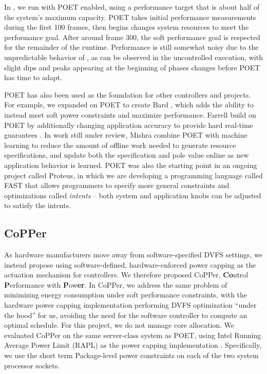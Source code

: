 In , we run with POET enabled, using a performance target that is about half of the system's maximum capacity.
POET takes initial performance measurements during the first 100 frames, then begins changes system resources to meet the performance goal.
After around frame 300, the soft performance goal is respected for the remainder of the runtime.
Performance is still somewhat noisy due to the unpredictable behavior of , as can be observed in the uncontrolled execution, with slight dips and peaks appearing at the beginning of phases changes before POET has time to adapt.

POET has also been used as the foundation for other controllers and projects.
For example, we expanded on POET to create Bard \cite{Bard}, which adds the ability to instead meet soft power constraints and maximize performance.
Farrell \etal build on POET by additionally changing application accuracy to provide hard real-time guarantees \cite{meantime}.
In work still under review, Mishra \etal combine POET with machine learning to reduce the amount of offline work needed to generate resource specifications, and update both the specification and pole value online as new application behavior is learned.
POET was also the starting point in an ongoing project called Proteus, in which we are developing a programming language called FAST that allows programmers to specify more general constraints and optimizations called \emph{intents} -- both system and application knobs can be adjusted to satisfy the intents.


\subsection{CoPPer}

As hardware manufacturers move away from software-specified DVFS settings, we instead propose using software-defined, hardware-enforced power capping as the actuation mechanism for controllers.
We therefore proposed CoPPer, \textbf{Co}ntrol \textbf{P}erformance with \textbf{P}ow\textbf{er}.
In CoPPer, we address the same problem of minimizing energy consumption under soft performance constraints, with the hardware power capping implementation performing DVFS optimization ``under the hood'' for us, avoiding the need for the software controller to compute an optimal schedule.
For this project, we do not manage core allocation.
We evaluated CoPPer on the same server-class system as POET, using Intel Running Average Power Limit (RAPL) as the power capping implementation \cite{RAPL}.
Specifically, we use the short term Package-level power constraints on each of the two system processor sockets.

